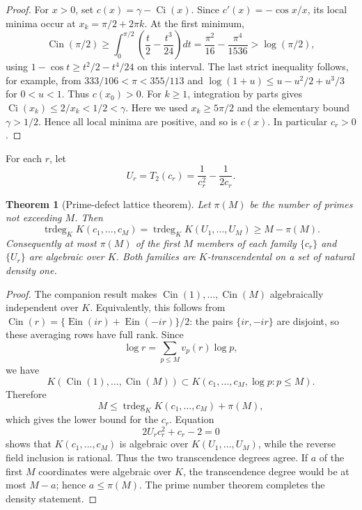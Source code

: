 \documentclass[11pt]{article}
\newtheorem{theorem}{Theorem}[section]
\theoremstyle{definition}
\theoremstyle{remark}
\newcommand{\Ein}{\operatorname{Ein}}
\newcommand{\Cin}{\operatorname{Cin}}
\newcommand{\Ci}{\operatorname{Ci}}
\newcommand{\trdeg}{\operatorname{trdeg}}
\begin{document}
\begin{proof}
For \(x>0\), set \(c(x)=\gamma-\Ci(x)\).  Since
\(c'(x)=-\cos x/x\), its local minima occur at
\(x_k=\pi/2+2\pi k\).  At the first minimum,
\[
 \Cin(\pi/2)
 \ge \int_0^{\pi/2}\left(\frac t2-\frac{t^3}{24}\right)dt
 =\frac{\pi^2}{16}-\frac{\pi^4}{1536}
 >\log(\pi/2),
\]
using \(1-\cos t\ge t^2/2-t^4/24\) on this interval.  The last strict
inequality follows, for example, from
\(333/106<\pi<355/113\) and
\(\log(1+u)\le u-u^2/2+u^3/3\) for \(0<u<1\).
Thus
\(c(x_0)>0\).  For \(k\ge1\), integration by parts gives
\(\Ci(x_k)\le2/x_k<1/2<\gamma\).  Here we used
\(x_k\ge5\pi/2\) and the elementary bound \(\gamma>1/2\).
Hence all local minima are positive, and so is
\(c(x)\).  In particular \(c_r>0\).
\end{proof}

For each \(r\), let
\begin{equation}\label{eq:Ur}
 U_r=T_2(c_r)=\frac1{c_r^2}-\frac1{2c_r}.
\end{equation}

\begin{theorem}[Prime-defect lattice theorem]
\label{thm:prime-defect}
Let \(\pi(M)\) be the number of primes not exceeding \(M\).  Then
\begin{equation}\label{eq:prime-defect-trdeg}
 \trdeg_KK(c_1,\ldots,c_M)
 =\trdeg_KK(U_1,\ldots,U_M)
 \ge M-\pi(M).
\end{equation}
Consequently at most \(\pi(M)\) of the first \(M\) members of each family
\(\{c_r\}\) and \(\{U_r\}\) are algebraic over \(K\).  Both families are
\(K\)-transcendental on a set of natural density one.
\end{theorem}

\begin{proof}
The companion result \cite[Cor.~5.5]{KEIO2026I} makes
\(\Cin(1),\ldots,\Cin(M)\) algebraically independent over \(K\).
Equivalently, this follows from
\(\Cin(r)=\{\Ein(ir)+\Ein(-ir)\}/2\): the pairs
\(\{ir,-ir\}\) are disjoint, so these averaging rows have full rank.
Since
\[
 \log r=\sum_{p\le M}v_p(r)\log p,
\]
we have
\[
 K(\Cin(1),\ldots,\Cin(M))
 \subset K(c_1,\ldots,c_M,\log p:p\le M).
\]
Therefore
\[
 M\le \trdeg_KK(c_1,\ldots,c_M)+\pi(M),
\]
which gives the lower bound for the \(c_r\).  Equation
\[
 2U_rc_r^2+c_r-2=0
\]
shows that \(K(c_1,\ldots,c_M)\) is algebraic over
\(K(U_1,\ldots,U_M)\), while the reverse field inclusion is rational.
Thus the two transcendence degrees agree.  If \(a\) of the first \(M\)
coordinates were algebraic over \(K\), the transcendence degree would be at
most \(M-a\); hence \(a\le\pi(M)\).  The prime number theorem completes the
density statement.
\end{proof}
\end{document}
